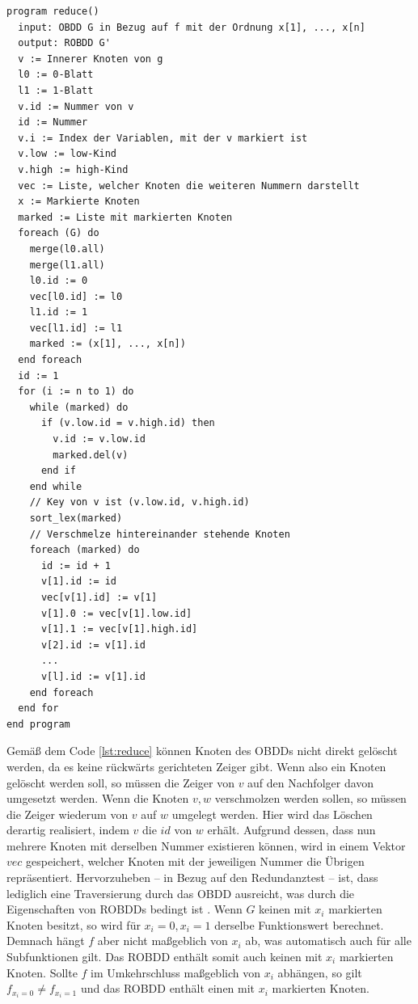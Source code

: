 \lstset{language=xml}
\begin{lstlisting}[frame=htrbl, caption={Implementierung von {\ttfamily reduce}}, label={lst:reduce}]
program reduce()
  input: OBDD G in Bezug auf f mit der Ordnung x[1], ..., x[n]
  output: ROBDD G'
  v := Innerer Knoten von g
  l0 := 0-Blatt
  l1 := 1-Blatt
  v.id := Nummer von v
  id := Nummer
  v.i := Index der Variablen, mit der v markiert ist
  v.low := low-Kind
  v.high := high-Kind
  vec := Liste, welcher Knoten die weiteren Nummern darstellt
  x := Markierte Knoten
  marked := Liste mit markierten Knoten
  foreach (G) do
    merge(l0.all)
    merge(l1.all)
    l0.id := 0
    vec[l0.id] := l0
    l1.id := 1
    vec[l1.id] := l1
    marked := (x[1], ..., x[n])
  end foreach
  id := 1
  for (i := n to 1) do
    while (marked) do
      if (v.low.id = v.high.id) then
        v.id := v.low.id
        marked.del(v)
      end if
    end while
    // Key von v ist (v.low.id, v.high.id)
    sort_lex(marked)
    // Verschmelze hintereinander stehende Knoten
    foreach (marked) do
      id := id + 1
      v[1].id := id
      vec[v[1].id] := v[1]
      v[1].0 := vec[v[1].low.id]
      v[1].1 := vec[v[1].high.id]
      v[2].id := v[1].id
      ...
      v[l].id := v[1].id
    end foreach
  end for
end program
\end{lstlisting}
Gemäß dem Code \ref{lst:reduce} können Knoten des OBDDs nicht direkt gelöscht werden, da es keine rückwärts gerichteten Zeiger gibt. Wenn also ein Knoten gelöscht werden soll, so müssen die Zeiger von $v$ auf den Nachfolger davon umgesetzt werden. Wenn die Knoten $v, w$ verschmolzen werden sollen, so müssen die Zeiger wiederum von $v$ auf $w$ umgelegt werden. Hier wird das Löschen derartig realisiert, indem $v$ die $id$ von $w$ erhält. Aufgrund dessen, dass nun mehrere Knoten mit derselben Nummer existieren können, wird in einem Vektor $vec$ gespeichert, welcher Knoten mit der jeweiligen Nummer die Übrigen repräsentiert. Hervorzuheben -- in Bezug auf den Redundanztest -- ist, dass lediglich eine Traversierung durch das OBDD ausreicht, was durch die Eigenschaften von ROBDDs bedingt ist \cite[S.44]{s2007}. Wenn $G$ keinen mit $x_i$ markierten Knoten besitzt, so wird für $x_i=0, x_i=1$ derselbe Funktionswert berechnet. Demnach hängt $f$ aber nicht maßgeblich von $x_i$ ab, was automatisch auch für alle Subfunktionen gilt. Das ROBDD enthält somit auch keinen mit $x_i$ markierten Knoten. Sollte $f$ im Umkehrschluss maßgeblich von $x_i$ abhängen, so gilt $f_{x_i=0} \neq f_{x_i=1}$ und das ROBDD enthält einen mit $x_i$ markierten Knoten.\\
